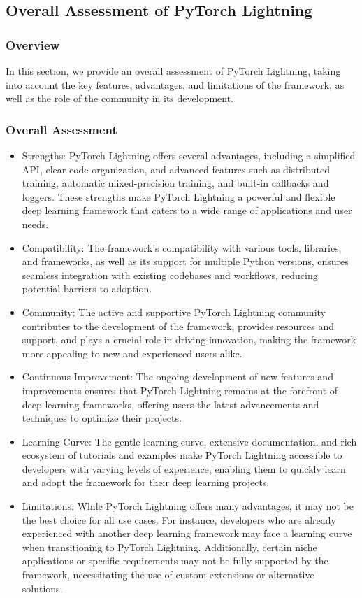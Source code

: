 \documentclass[12pt]{article}
\begin{document}
\subsection{Overall Assessment of PyTorch Lightning}

\subsubsection{Overview}

In this section, we provide an overall assessment of PyTorch Lightning, taking into account the key features, advantages, and limitations of the framework, as well as the role of the community in its development.

\subsubsection{Overall Assessment}

\begin{itemize}
    \item Strengths: PyTorch Lightning offers several advantages, including a simplified API, clear code organization, and advanced features such as distributed training, automatic mixed-precision training, and built-in callbacks and loggers. These strengths make PyTorch Lightning a powerful and flexible deep learning framework that caters to a wide range of applications and user needs.
    \item Compatibility: The framework's compatibility with various tools, libraries, and frameworks, as well as its support for multiple Python versions, ensures seamless integration with existing codebases and workflows, reducing potential barriers to adoption.
    \item Community: The active and supportive PyTorch Lightning community contributes to the development of the framework, provides resources and support, and plays a crucial role in driving innovation, making the framework more appealing to new and experienced users alike.
    \item Continuous Improvement: The ongoing development of new features and improvements ensures that PyTorch Lightning remains at the forefront of deep learning frameworks, offering users the latest advancements and techniques to optimize their projects.
    \item Learning Curve: The gentle learning curve, extensive documentation, and rich ecosystem of tutorials and examples make PyTorch Lightning accessible to developers with varying levels of experience, enabling them to quickly learn and adopt the framework for their deep learning projects.
    \item Limitations: While PyTorch Lightning offers many advantages, it may not be the best choice for all use cases. For instance, developers who are already experienced with another deep learning framework may face a learning curve when transitioning to PyTorch Lightning. Additionally, certain niche applications or specific requirements may not be fully supported by the framework, necessitating the use of custom extensions or alternative solutions.
\end{itemize}
\end{document}
